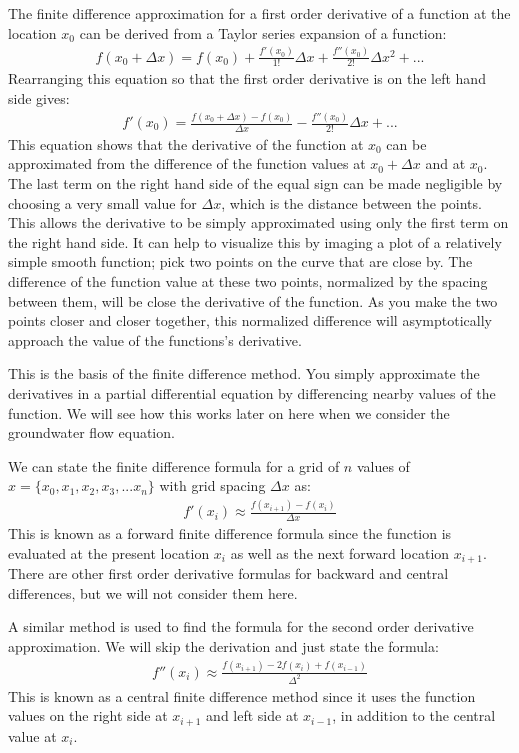\documentclass[11pt, oneside]{article}   	%
\begin{document}
 The finite difference approximation for a first order derivative of a function at the location $x_0$ can be derived from a Taylor series expansion of a function:
 \begin{eqnarray}
f(x_0 + \Delta x) = f(x_0) + \frac{f'(x_0)}{1!} \Delta x + \frac{f''(x_0)}{2!}\Delta x^2 + ...
\end{eqnarray}
Rearranging this equation so that the first order derivative is on the left hand side gives:
\begin{eqnarray}
f'(x_0) = \frac{f(x_0 + \Delta x) - f(x_0)}{\Delta x} - \frac{f''(x_0)}{2!} \Delta x + ...
\end{eqnarray}
This equation shows that  the derivative of the function at $x_0$ can be approximated from the difference of the function values at $x_0+ \Delta x$ and at $x_0$.   The last term on the right hand side of the equal sign can be made negligible by choosing a very small value for $\Delta x$, which is the distance between the points. This allows the derivative to be simply approximated using only the first term on the right hand side. It can help to visualize this by imaging a plot of a relatively simple smooth function; pick two points on the curve that are close by. The difference of the function value at these two points, normalized by the spacing between them, will be close the derivative of the function. As you make the two points closer and closer together, this normalized difference will asymptotically approach the value of the functions's derivative.
 
This is the basis of the finite difference method. You simply approximate the derivatives in a partial differential equation by differencing nearby values of the function. We will see how this works later on here when we consider the groundwater flow equation.

We can state the finite difference formula for a grid of $n$ values of $x = \{x_0, x_1, x_2, x_3, ... x_n\}$ with grid spacing $\Delta x$ as:
\begin{eqnarray}
f'(x_i) \approx \frac{f(x_{i+1}) - f(x_i)}{\Delta x} 
\label{FOFD}
\end{eqnarray}
This is known as a forward finite difference formula since the function is evaluated at the present location $x_i$ as well as the next forward location $x_{i+1}$. There are other first order derivative formulas for backward and central differences, but we will not consider them here.

A similar method is used to find the formula for the second order derivative approximation. We will skip the derivation and just state the formula:
\begin{eqnarray}
f''(x_i) \approx \frac{f(x_{i+1}) - 2 f(x_i) + f(x_{i-1})  }{\Delta^2} 
\label{SOFD}
\end{eqnarray}
This is known as a central finite difference method since it uses the function  values on the right side at $x_{i+1}$ and left side at $x_{i-1}$, in addition to the central value at $x_i$.
\end{document}
